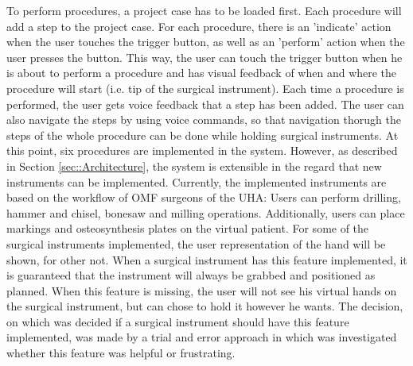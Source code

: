 To perform procedures, a project case has to be loaded first.
Each procedure will add a step to the project case.
For each procedure, there is an 'indicate' action when the user touches the trigger button, as well as an 'perform' action when the user presses the button.
This way, the user can touch the trigger button when he is about to perform a procedure and has visual feedback of when and where the procedure will start (i.e. tip of the surgical instrument).
Each time a procedure is performed, the user gets voice feedback that a step has been added.
The user can also navigate the steps by using voice commands, so that navigation thorugh the steps of the whole procedure can be done while holding surgical instruments.
At this point, six procedures are implemented in the system.
However, as described in Section \ref{sec::Architecture}, the system is extensible in the regard that new instruments can be implemented.
Currently, the implemented instruments are based on the workflow of OMF surgeons of the UHA: Users can perform drilling, hammer and chisel, bonesaw and milling operations.
Additionally, users can place markings and osteosynthesis plates on the virtual patient.
For some of the surgical instruments implemented, the user representation of the hand will be shown, for other not.
When a surgical instrument has this feature implemented, it is guaranteed that the instrument will always be grabbed and positioned as planned.
When this feature is missing, the user will not see his virtual hands on the surgical instrument, but can chose to hold it however he wants.
The decision, on which was decided if a surgical instrument should have this feature implemented, was made by a trial and error approach in which was investigated whether this feature was helpful or frustrating.






